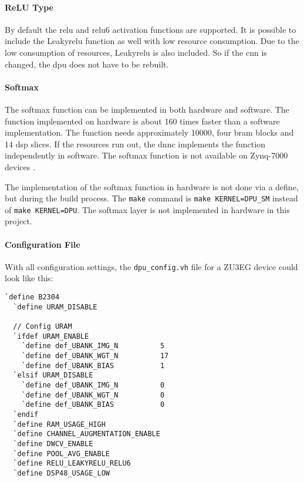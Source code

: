 \paragraph{ReLU Type}
By default the \acrshort{relu} and \acrshort{relu}6 activation functions are supported.
It is possible to include the Leaky\acrshort{relu} function as well with low resource consumption.
Due to the low consumption of resources, Leaky\acrshort{relu} is also included.
So if the \acrshort{cnn} is changed, the \acrshort{dpu} does not have to be rebuilt.

\paragraph{Softmax}
The softmax function can be implemented in both hardware and software.
The function implemented on hardware is about 160 times faster than a software implementation.
The function needs approximately \SI{10000}{}, four \acrshort{bram} blocks and 14 \acrshort{dsp} slices.
If the resources run out, the \acrlong{dnnc} implements the function independently in software.
The softmax function is not available on Zynq-7000 devices \cite{dpu_product_guide}.

The implementation of the softmax function in hardware is not done via a define, but during the build process.
The \texttt{make} command is \texttt{make KERNEL=DPU\_SM} instead of \texttt{make KERNEL=DPU}.
The softmax layer is not implemented in hardware in this project.

\paragraph{Configuration File}
With all configuration settings, the \texttt{dpu\_config.vh} file for a ZU3EG device could look like this:

\begin{lstlisting}[style=bash, caption={DPU configuration}, label=lst:config_dpu]
  `define B2304
  `define URAM_DISABLE

  // Config URAM
  `ifdef URAM_ENABLE
    `define def_UBANK_IMG_N          5
    `define def_UBANK_WGT_N          17
    `define def_UBANK_BIAS           1
  `elsif URAM_DISABLE
    `define def_UBANK_IMG_N          0
    `define def_UBANK_WGT_N          0
    `define def_UBANK_BIAS           0
  `endif
  `define RAM_USAGE_HIGH
  `define CHANNEL_AUGMENTATION_ENABLE
  `define DWCV_ENABLE
  `define POOL_AVG_ENABLE
  `define RELU_LEAKYRELU_RELU6
  `define DSP48_USAGE_LOW
\end{lstlisting}


